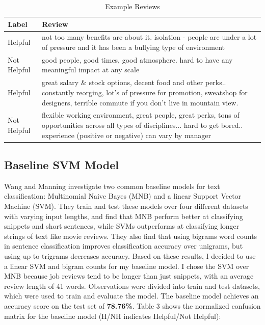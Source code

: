 \documentclass[11pt,a4paper]{article}
\begin{document}
	
	\begin{table}[h]
		\begin{center}
			\begin{tabular}{|p{3cm}|p{5cm}|}
				\hline \textbf{Label} & \textbf{Review} \\ \hline
				Helpful & not too many benefits are about it. isolation - people are under a lot of pressure and it has been a bullying type of environment \\
				\hline
				Not Helpful & good people, good times, good atmosphere. hard to have any meaningful impact at any scale \\
				\hline
				Helpful & great salary \& stock options, decent food and other perks.. constantly reorging, lot's of pressure for promotion, sweatshop for designers, terrible commute if you don't live in mountain view. \\
				\hline
				Not Helpful & flexible working environment, great people, great perks, tons of opportunities across all types of disciplines... hard to get bored.. experience (positive or negative) can vary by manager \\
				\hline
			\end{tabular}
			\caption[scale=0.75]{Example Reviews}
		\end{center}
	\end{table}
	
	\subsection{Baseline SVM Model}
	Wang and Manning \cite{Wang} investigate two common baseline models for text classification: Multinomial Naive Bayes (MNB) and a linear Support Vector Machine (SVM). They train and test these models over four different datasets with varying input lengths, and find that MNB perform better at classifying snippets and short sentences, while SVMs outperforms at classifying longer strings of text like movie reviews. They also find that using bigrams word counts in sentence classification improves classification accuracy over unigrams, but using up to trigrams decreases accuracy. Based on these results, I decided to use a linear SVM and bigram counts for my baseline model. I chose the SVM over MNB because job reviews tend to be longer than just snippets, with an average review length of 41 words. Observations were divided into train and test datasets, which were used to train and evaluate the model. The baseline model achieves an accuracy score on the test set of \textbf{78.76\%}. Table 3 shows the normalized confusion matrix for the baseline model (H/NH indicates Helpful/Not Helpful):
	
\end{document}
